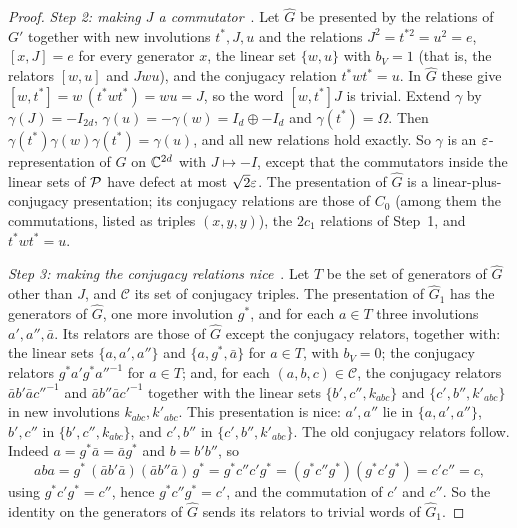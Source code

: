 \begin{proof}
\emph{Step 2: making $J$ a commutator}~\cite[Lemma~5.2]{Slo19}. Let $\widehat G$ be presented by the relations of $G'$ together with new
involutions $t^*,J,u$ and the relations $J^2=t^{*2}=u^2=e$, $[x,J]=e$ for every generator $x$, the linear set $\{w,u\}$ with $b_V=1$ (that
is, the relators $[w,u]$ and $Jwu$), and the conjugacy relation $t^*wt^*=u$. In $\widehat G$ these give
$[w,t^*]=w\,(t^*wt^*)=wu=J$, so the word $[w,t^*]J$ is trivial. Extend $\gamma$ by $\gamma(J)=-I_{2d}$, $\gamma(u)=-\gamma(w)=I_d\oplus-I_d$
and $\gamma(t^*)=\Omega$. Then $\gamma(t^*)\gamma(w)\gamma(t^*)=\gamma(u)$, and all new relations hold exactly. So $\gamma$ is an
$\varepsilon$-representation of $\widehat G$ on $\mathbb C^{2d}$ with $J\mapsto-I$, except that the commutators inside the linear sets of $\mathcal P$ have defect
at most $\sqrt2\varepsilon$. The presentation of $\widehat G$ is a linear-plus-conjugacy
presentation; its conjugacy relations are those of $C_0$ (among them the commutations, listed as triples $(x,y,y)$), the $2c_1$ relations
of Step~1, and $t^*wt^*=u$.

\emph{Step 3: making the conjugacy relations nice}~\cite[Lemma~4.4]{Slo19}. Let $T$ be the set of generators of $\widehat G$ other than $J$,
and $\mathcal C$ its set of conjugacy triples. The presentation of $\widehat G_1$ has the generators of $\widehat G$, one more involution $g^*$,
and for each $a\in T$ three involutions $a',a'',\bar a$. Its relators are those of $\widehat G$ except the conjugacy relators, together with:
the linear sets $\{a,a',a''\}$ and $\{a,g^*,\bar a\}$ for $a\in T$, with $b_V=0$; the conjugacy relators $g^*a'g^*a''^{-1}$ for $a\in T$; and,
for each $(a,b,c)\in\mathcal C$, the conjugacy relators $\bar ab'\bar ac''^{-1}$ and $\bar ab''\bar ac'^{-1}$ together with the linear sets
$\{b',c'',k_{abc}\}$ and $\{c',b'',k'_{abc}\}$ in new involutions $k_{abc},k'_{abc}$. This presentation is nice: $a',a''$ lie in
$\{a,a',a''\}$, $b',c''$ in $\{b',c'',k_{abc}\}$, and $c',b''$ in $\{c',b'',k'_{abc}\}$. The old conjugacy relators follow. Indeed
$a=g^*\bar a=\bar ag^*$ and $b=b'b''$, so
\[
aba=g^*\,(\bar ab'\bar a)(\bar ab''\bar a)\,g^*=g^*c''c'g^*=(g^*c''g^*)(g^*c'g^*)=c'c''=c,
\]
using $g^*c'g^*=c''$, hence $g^*c''g^*=c'$, and the commutation of $c'$ and $c''$. So the identity on the generators of $\widehat G$ sends its
relators to trivial words of $\widehat G_1$.


\end{proof}

